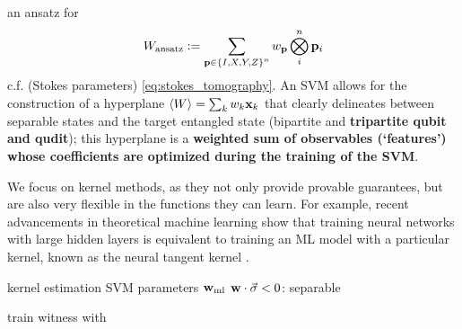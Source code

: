\documentclass[
reprint,
aps,
pra,
floatfix,
]{revtex4-2}
\theoremstyle{plain}
\theoremstyle{definition}
\newcommand{\ew}{W}
\newcommand{\ml}{\text{ml}}
\newcommand{\ansatz}{\textup{ansatz}}
\newcommand{\sx}{\hat{\sigma}_x}
\newcommand{\sy}{\hat{\sigma}_y}
\newcommand{\sz}{\hat{\sigma}_z}
\begin{document}
an ansatz for  
\begin{equation}
	\ew_{\ansatz} := 
	\sum_{\vb{p}\in \qty{I,X,Y,Z}^n} w_{\vb{p}}  
	\bigotimes_i^n 
	\vb{p}_i
\end{equation}
c.f.  (Stokes parameters) \cref{eq:stokes_tomography}.
An SVM allows for the construction of a hyperplane $\expval{\ew}=\sum_k w_k \vbx_{k}$ that clearly delineates between separable states and the target entangled state (bipartite and \textbf{tripartite qubit and qudit}); this hyperplane is a \textbf{weighted sum of observables (`features') whose coefficients are optimized during the training of the SVM}.

We focus on kernel methods, as they not only provide provable guarantees, but are also very flexible in the functions they can learn. For example, recent advancements in theoretical machine learning show that training neural networks with large hidden layers is equivalent to training an ML model with a particular kernel, known as the neural tangent kernel \cite{jacotNeuralTangentKernel2020}.

\begin{algorithm}[H]
    \DontPrintSemicolon
    \Output{classifier $\vbw_{\ml}$}
    \BlankLine
     {
        kernel estimation 
        SVM 
    {\Return parameters $\vbw_{\ml}$} 
    }
    \Return $ \vb{w}\cdot \vec{\sigma}<0 $: \textsf{separable} 
    \caption{train witness with  }
    \label{alg:classical_learning}
\end{algorithm}
\end{document}
